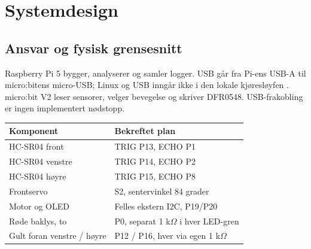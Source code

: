 \chapter{Systemdesign}
\label{ch:design}
\section{Ansvar og fysisk grensesnitt}
Raspberry Pi 5 bygger, analyserer og samler logger. USB går fra Pi-ens
USB-A til micro:bitens micro-USB; Linux og USB inngår ikke i den lokale
kjøresløyfen \cite{microbitusb2026}. micro:bit V2 leser sensorer, velger
bevegelse og skriver DFR0548. USB-frakobling er ingen implementert nødstopp.

\begin{center}
\end{center}

\begin{tabularx}{\textwidth}{@{}P{42mm}Y@{}}\toprule
Komponent & Bekreftet plan\\\midrule
HC-SR04 front & TRIG P13, ECHO P1\\
HC-SR04 venstre & TRIG P14, ECHO P2\\
HC-SR04 høyre & TRIG P15, ECHO P8\\
Frontservo & S2, sentervinkel 84 grader\\
Motor og OLED & Felles ekstern I2C, P19/P20\\
Røde baklys, to & P0, separat 1 k$\Omega$ i hver LED-gren\\
Gult foran venstre / høyre & P12 / P16, hver via egen 1 k$\Omega$\\\bottomrule
\end{tabularx}


